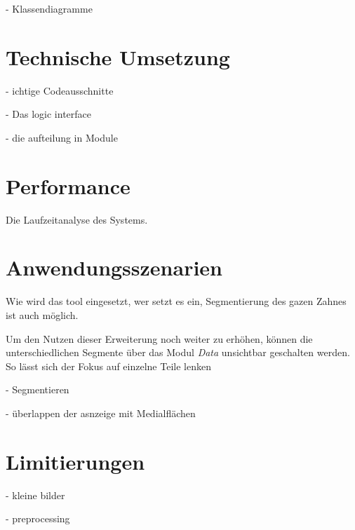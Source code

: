 - Klassendiagramme

\section{Technische Umsetzung}
- ichtige Codeausschnitte

- Das logic interface

- die aufteilung in Module

\section{Performance}
Die Laufzeitanalyse des Systems.

\section{Anwendungsszenarien}
Wie wird das tool eingesetzt, wer setzt es ein, Segmentierung des gazen Zahnes ist
auch möglich.

Um den Nutzen dieser Erweiterung noch weiter zu erhöhen, können die
unterschiedlichen Segmente über das Modul \textit{Data} unsichtbar geschalten werden.
So lässt sich der Fokus auf einzelne Teile lenken

- Segmentieren

- überlappen der asnzeige mit Medialflächen


\section{Limitierungen}

- kleine bilder

- preprocessing
